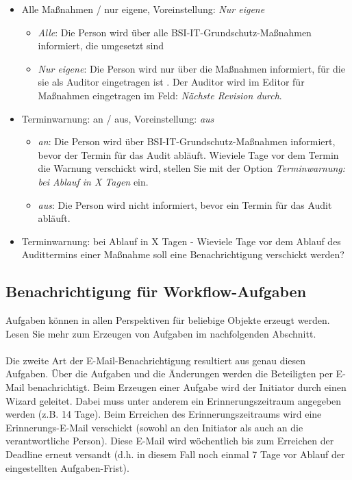 \documentclass[a4paper,10pt]{book}
\begin{document}
\begin{itemize}
 \item Alle Maßnahmen / nur eigene, Voreinstellung: {\em Nur eigene}
  \begin{itemize}
   \item {\em Alle}: Die Person wird über alle BSI-IT-Grundschutz-Maßnahmen informiert, die umgesetzt sind
   \item {\em Nur eigene}: Die Person wird nur über die Maßnahmen informiert, für die sie als Auditor eingetragen ist . Der Auditor wird im Editor für Maßnahmen eingetragen im Feld: {\em Nächste Revision durch}.
  \end{itemize}
 \item Terminwarnung: an / aus, Voreinstellung: {\em aus}
  \begin{itemize}
   \item {\em an}: Die Person wird über BSI-IT-Grundschutz-Maßnahmen informiert, bevor der Termin für das Audit abläuft. Wieviele Tage vor dem Termin die Warnung verschickt wird, stellen Sie mit der Option {\em Terminwarnung: bei Ablauf in X Tagen} ein.
   \item {\em aus}: Die Person wird nicht informiert, bevor ein Termin für das Audit abläuft.
  \end{itemize}
 \item Terminwarnung: bei Ablauf in X Tagen - Wieviele Tage vor dem Ablauf des Audittermins einer Maßnahme soll eine Benachrichtigung verschickt werden?
\end{itemize}



\subsection{Benachrichtigung für Workflow-Aufgaben}
Aufgaben können in allen Perspektiven für beliebige Objekte erzeugt werden. Lesen Sie mehr zum Erzeugen von Aufgaben im nachfolgenden Abschnitt.
\\
\\
Die zweite Art der E-Mail-Benachrichtigung resultiert aus genau diesen Aufgaben. Über die Aufgaben und die Änderungen werden die Beteiligten per E-Mail benachrichtigt.
Beim Erzeugen einer Aufgabe wird der Initiator durch einen Wizard geleitet. Dabei muss unter anderem ein Erinnerungszeitraum angegeben werden (z.B. 14 Tage).
Beim Erreichen des Erinnerungszeitraums wird eine Erinnerungs-E-Mail verschickt (sowohl an den Initiator als auch an die verantwortliche Person). Diese E-Mail wird
wöchentlich bis zum Erreichen der Deadline erneut versandt (d.h. in diesem Fall noch einmal 7 Tage vor Ablauf der eingestellten Aufgaben-Frist).
\end{document}
